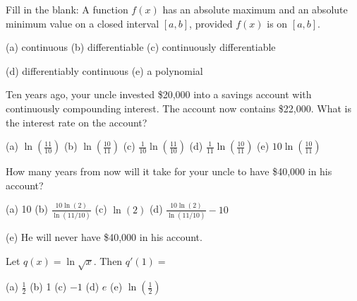 \documentclass[12pt]{article}
\newcommand{\ds}{\displaystyle}
\newenvironment{problem}[2][Problem]{\begin{trivlist}
\item[\hskip \labelsep {\bfseries #1}\hskip \labelsep {\bfseries #2.}]}{\end{trivlist}}
\begin{document}
\vspace{.7in}

\begin{problem}{25}
Fill in the blank: A function $f(x)$ has an absolute maximum and an absolute minimum value on a closed interval $[a,b]$, provided $f(x)$ is \underline{\phantom{aaaaaaaaaa}} on $[a,b]$. 
\begin{center}
  (a) continuous \qquad
  (b) differentiable \qquad
  (c) continuously differentiable
\end{center}
\begin{center}
  (d) differentiably continuous \qquad
  (e) a polynomial
\end{center}
\end{problem}

\vspace{.7in}

\begin{problem}{26}
Ten years ago, your uncle invested \$20,000 into a savings account with continuously compounding interest. The account now contains \$22,000. What is the interest rate on the account? 
\begin{center}
  (a) $\ds\ln\left (\frac{11}{10}\right )$ \qquad
  (b) $\ds\ln\left (\frac{10}{11}\right )$ \qquad
  (c) $\ds\frac{1}{10}\ln\left (\frac{11}{10}\right )$ \qquad
  (d) $\ds\frac{1}{11}\ln\left (\frac{10}{11}\right )$ \qquad
  (e) $10\ln\left (\frac{10}{11}\right )$
\end{center}
\end{problem}

\newpage

\begin{problem}{27}
How many years from now will it take for your uncle to have \$40,000 in his account? 
\begin{center}
  (a) 10 \qquad
  (b) $\ds\frac{10\ln(2)}{\ln(11/10)}$ \qquad
  (c) $\ln(2)$ \qquad
  (d) $\ds\frac{10\ln(2)}{\ln(11/10)} - 10$
\end{center}
\begin{center}
  (e) He will never have \$40,000 in his account. \qquad\phantom{aaaaaaaaa}
\end{center}
\end{problem}

\vspace{1.2in}

\begin{problem}{28}
Let $q(x) = \ln\sqrt{x}$. Then $q'(1) = $
\begin{center}
  (a) $\ds\frac{1}{2}$ \qquad
  (b) 1 \qquad
  (c) $-1$ \qquad
  (d) $e$ \qquad
  (e) $\ds\ln\left (\frac{1}{2}\right )$
\end{center}
\end{problem}
\end{document}

